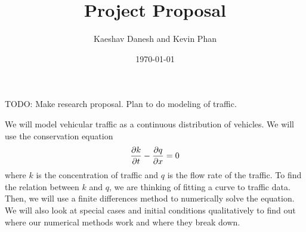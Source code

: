 \documentclass[12pt]{article}
\title{Project Proposal}
\author{Kaeshav Danesh and Kevin Phan}
\date{\today}
\begin{document}
	
	\maketitle
    TODO: Make research proposal. Plan to do modeling of traffic. 

    We will model vehicular traffic as a continuous distribution of vehicles. We will use the conservation equation 
    \begin{equation}
        \pdv{k}{t} - \pdv{q}{x} = 0
    \end{equation}
    where $k$ is the concentration of traffic and $q$ is the flow rate of the traffic. To find the relation between $k$ and $q$, we are thinking of fitting a curve to traffic data. Then, we will use a finite differences method to numerically solve the equation. We will also look at special cases and initial conditions qualitatively to find out where our numerical methods work and where they break down.
\end{document}
